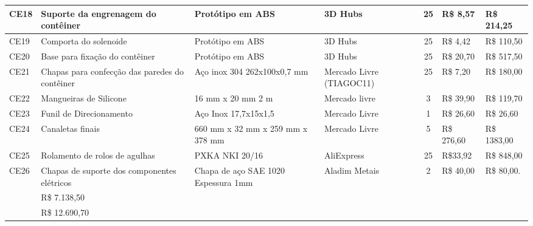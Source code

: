 \begin{table}[H]
\begin{adjustbox}{max width = 1\textwidth}
\begin{tabular}{|l|G{4cm}|C{2.4cm}|L{3.2cm}|c|l|l|}
        CE18 & Suporte da engrenagem do contêiner & Protótipo em ABS & 3D Hubs & 25  & R\$ 8,57 & R\$ 214,25  \\ \hline
        CE19 & Comporta do solenoide & Protótipo em ABS & 3D Hubs & 25  & R\$ 4,42 & R\$ 110,50  \\ \hline
        CE20 & Base para fixação do contêiner & Protótipo em ABS & 3D Hubs & 25  & R\$ 20,70 & R\$ 517,50  \\ \hline
        CE21 & Chapas para confecção das paredes do contêiner & Aço inox 304 262x100x0,7 mm & Mercado Livre (TIAGOC11) & 25  & R\$ 7,20 & R\$ 180,00  \\ \hline
        CE22 & Mangueiras de Silicone & 16 mm x 20 mm 2 m & Mercado livre & 3 & R\$ 39,90 & R\$ 119,70 \\ \hline
        CE23 & Funil de Direcionamento & Aço Inox 17,7x15x1,5 & Mercado Livre & 1 & R\$ 26,60 & R\$ 26,60 \\ \hline
        CE24 & Canaletas finais & 660 mm x 32 mm x 259 mm x 378 mm & Mercado Livre & 5 & R\$ 276,60 & R\$ 1383,00\\ \hline
        CE25 & Rolamento de rolos de agulhas & PXKA NKI 20/16 & AliExpress & 25 & R\$33,92 & R\$ 848,00 \\ \hline
        CE26 & Chapas de suporte dos componentes elétricos &  Chapa de aço SAE 1020 Espessura 1mm & Aladim Metais & 2 & R\$ 40,00 & R\$ 80,00. \\ \hline
        
         & R\$ 7.138,50\\ \hline
        
         & \color{white}R\$ 12.690,70\\ \hline
        \end{tabular}
	\end{adjustbox}
\end{table}


        
